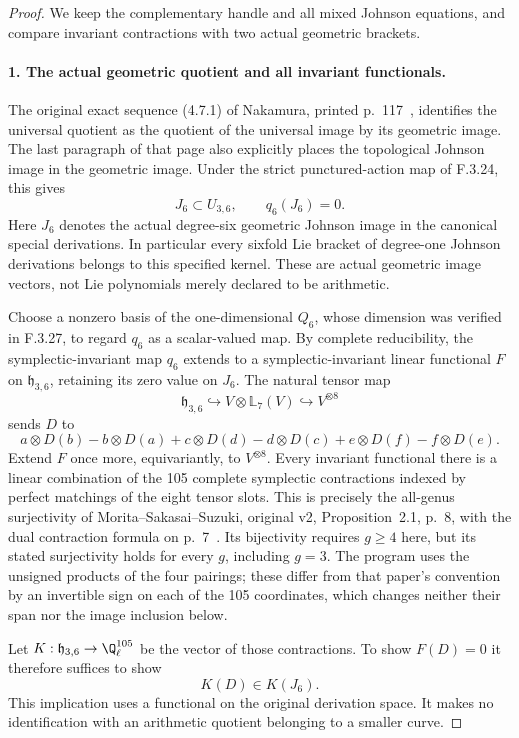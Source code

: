\begin{proof}
We keep the complementary handle and all mixed Johnson equations, and compare invariant contractions with two actual geometric brackets.
\paragraph{1. The actual geometric quotient and all invariant functionals.}
The original exact sequence (4.7.1) of Nakamura,
printed p.~117~\cite{AuditNakamura1996}, identifies the universal quotient
as the quotient of the universal image by its
geometric image. The last paragraph of that page
also explicitly places the topological Johnson
image in the geometric image. Under the strict
punctured-action map of F.3.24, this gives
\[
                    J_6\subset U_{3,6},\qquad q_6(J_6)=0.
                                                               \tag{PT.2}
\]
Here $J_6$ denotes the actual degree-six geometric
Johnson image in the canonical special derivations.
In particular every sixfold Lie bracket of
degree-one Johnson derivations belongs to this
specified kernel. These are actual geometric
image vectors, not Lie polynomials merely
declared to be arithmetic.

Choose a nonzero basis of the one-dimensional $Q_6$,
whose dimension was verified in F.3.27, to regard $q_6$
as a scalar-valued map. By complete reducibility, the
symplectic-invariant map $q_6$ extends to a symplectic-invariant linear
functional $F$ on $\mathfrak h_{3,6}$, retaining
its zero value on $J_6$. The natural tensor map
\[
 \mathfrak h_{3,6}\hookrightarrow V\otimes\mathbb L_7(V)
                      \hookrightarrow V^{\otimes8}
\]
sends $D$ to
\[
 a\otimes D(b)-b\otimes D(a)
 +c\otimes D(d)-d\otimes D(c)
 +e\otimes D(f)-f\otimes D(e).
\]
Extend $F$ once more, equivariantly, to $V^{\otimes8}$.
Every invariant functional there is a linear
combination of the 105 complete symplectic
contractions indexed by perfect matchings of
the eight tensor slots. This is precisely the
all-genus surjectivity of Morita--Sakasai--Suzuki,
original v2, Proposition~2.1, p.~8, with the
dual contraction formula on p.~7~\cite{AuditMoritaSakasaiSuzuki2015v2}. Its bijectivity
requires $g\geq4$ here, but its stated surjectivity
holds for every $g$, including $g=3$.
The program uses the unsigned products of the
four pairings; these differ from that paper's
convention by an invertible sign on each of
the 105 coordinates, which changes neither
their span nor the image inclusion below.

Let $K:\mathfrak h_{3,6}\to\Q_\ell^{105}$ be
the vector of those contractions. To show
$F(D)=0$ it therefore suffices to show
\[
                    K(D)\in K(J_6).                       \tag{PT.3}
\]
This implication uses a functional on the original
derivation space. It makes no identification with
an arithmetic quotient belonging to a smaller curve.


\end{proof}
